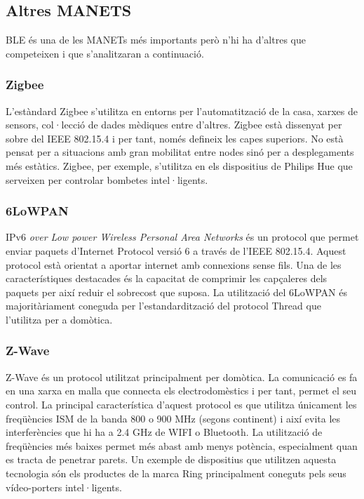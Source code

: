 \subsection{Altres MANETS}
BLE és una de les MANETs més importants però n'hi ha d'altres que competeixen i que s'analitzaran a continuació.

\subsubsection{Zigbee}
L'estàndard Zigbee s'utilitza en entorns per l'automatització de la casa, xarxes de sensors, col·lecció de dades mèdiques entre d'altres.
Zigbee està dissenyat per sobre del IEEE 802.15.4 i per tant, només defineix les capes superiors.
No està pensat per a situacions amb gran mobilitat entre nodes sinó per a desplegaments més estàtics.
Zigbee, per exemple, s'utilitza en els dispositius de Philips Hue que serveixen per controlar bombetes intel·ligents.

\subsubsection{6LoWPAN}
IPv6 \textit{over Low power Wireless Personal Area Networks} és un protocol que permet enviar paquets d'Internet Protocol versió 6 a través de l'IEEE 802.15.4.
Aquest protocol està orientat a aportar internet amb connexions sense fils.
Una de les característiques destacades és la capacitat de comprimir les capçaleres dels paquets per així reduir el sobrecost que suposa.
La utilització del 6LoWPAN és majoritàriament coneguda per l'estandardització del protocol Thread que l'utilitza per a domòtica.

\subsubsection{Z-Wave}
Z-Wave és un protocol utilitzat principalment per domòtica. La comunicació es fa en una xarxa en malla que connecta els electrodomèstics i per tant, permet el seu control.
La principal característica d'aquest protocol es que utilitza únicament les freqüències ISM de la banda 800 o 900 MHz (segons continent) i així evita les interferències que hi ha a 2.4 GHz de WIFI o Bluetooth.
La utilització de freqüències més baixes permet més abast amb menys potència, especialment quan es tracta de penetrar parets.
Un exemple de dispositius que utilitzen aquesta tecnologia són els productes de la marca Ring principalment coneguts pels seus vídeo-porters intel·ligents.

